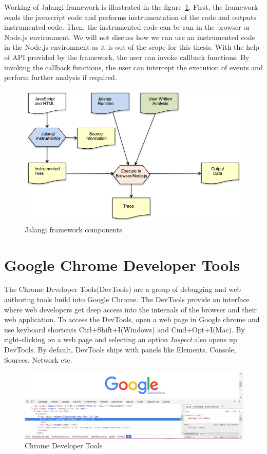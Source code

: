 Working of Jalangi framework is illustrated in the figure~\ref{fig:jalangi-components}. First, the framework reads the javascript code and performs instrumentation of the code and outputs instrumented code. Then, the instrumented code can be run in the browser or Node.js environment. We will not discuss how we can use an instrumented code in the Node.js environment as it is out of the scope for this thesis. With the help of API provided by the framework, the user can invoke callback functions. By invoking the callback functions, the user can intercept the execution of events and perform further analysis if required. 

\begin{figure}[!h]
	\centering
	\includegraphics[scale=0.5,trim=0 0 0 0]{images/jalangi-components.png}
	\caption{Jalangi framework components}
	\label{fig:jalangi-components}
\end{figure}

\section{Google Chrome Developer Tools}
The Chrome Developer Tools(DevTools) are a group of debugging and web authoring tools build into Google Chrome\cite{devtools}. The DevTools provide an interface where web developers get deep access into the internals of the browser and their web application. To access the DevTools, open a web page in Google chrome and use keyboard shortcuts Ctrl+Shift+I(Windows) and Cmd+Opt+I(Mac). By right-clicking on a web page and selecting an option \textit{Inspect} also opens up DevTools. By default, DevTools ships with panels like Elements, Console, Sources, Network etc.

\begin{figure}[!h]
	\centering
	\includegraphics[scale=0.5,trim=0 0 0 0]{images/chrome-devtools.png}
	\caption{Chrome Developer Tools}
	\label{fig:devtools}
\end{figure}

